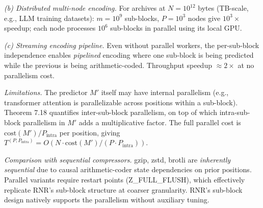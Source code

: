 \documentclass[
]{article}
\begin{document}
\emph{(b) Distributed multi-node encoding.} For archives at
$N = 10^{12}$ bytes (TB-scale, e.g., LLM training datasets):
$m = 10^9$ sub-blocks, $P = 10^3$ nodes give $10^3 \times$ speedup;
each node processes $10^6$ sub-blocks in parallel using its local GPU.

\emph{(c) Streaming encoding pipeline.} Even without parallel
workers, the per-sub-block independence enables \emph{pipelined}
encoding where one sub-block is being predicted while the previous is
being arithmetic-coded. Throughput speedup $\approx 2 \times$ at
no parallelism cost.

\emph{Limitations.} The predictor $M'$ itself may have internal
parallelism (e.g., transformer attention is parallelizable across
positions within a sub-block). Theorem 7.18 quantifies inter-sub-block
parallelism, on top of which intra-sub-block parallelism in $M'$ adds
a multiplicative factor. The full parallel cost is
$\mathrm{cost}(M') / P_{\mathrm{intra}}$ per position, giving
$T^{(P, P_{\mathrm{intra}})} = O(N \cdot \mathrm{cost}(M') /
(P \cdot P_{\mathrm{intra}}))$.

\emph{Comparison with sequential compressors.} gzip, zstd, brotli are
\emph{inherently sequential} due to causal arithmetic-coder state
dependencies on prior positions. Parallel variants require restart
points (Z\_FULL\_FLUSH), which effectively replicate RNR's sub-block
structure at coarser granularity. RNR's sub-block design natively
supports the parallelism without auxiliary tuning.
\end{document}
